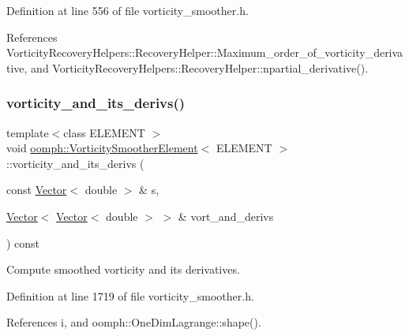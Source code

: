 Definition at line 556 of file vorticity\+\_\+smoother.\+h.



References Vorticity\+Recovery\+Helpers\+::\+Recovery\+Helper\+::\+Maximum\+\_\+order\+\_\+of\+\_\+vorticity\+\_\+derivative, and Vorticity\+Recovery\+Helpers\+::\+Recovery\+Helper\+::npartial\+\_\+derivative().

\mbox{\label{classoomph_1_1VorticitySmootherElement_a4bd88c454b07db0ef8b44e7912651425}} 
\subsubsection{\texorpdfstring{vorticity\+\_\+and\+\_\+its\+\_\+derivs()}{vorticity\_and\_its\_derivs()}}
{\footnotesize\ttfamily template$<$class E\+L\+E\+M\+E\+NT $>$ \\
void \hyperlink{classoomph_1_1VorticitySmootherElement}{oomph\+::\+Vorticity\+Smoother\+Element}$<$ E\+L\+E\+M\+E\+NT $>$\+::vorticity\+\_\+and\+\_\+its\+\_\+derivs (\begin{DoxyParamCaption}\item[{const \hyperlink{classoomph_1_1Vector}{Vector}$<$ double $>$ \&}]{s,  }\item[{\hyperlink{classoomph_1_1Vector}{Vector}$<$ \hyperlink{classoomph_1_1Vector}{Vector}$<$ double $>$ $>$ \&}]{vort\+\_\+and\+\_\+derivs }\end{DoxyParamCaption}) const\hspace{0.3cm}{\ttfamily [inline]}}



Compute smoothed vorticity and its derivatives. 



Definition at line 1719 of file vorticity\+\_\+smoother.\+h.



References i, and oomph\+::\+One\+Dim\+Lagrange\+::shape().

\mbox{\label{classoomph_1_1VorticitySmootherElement_a9bc82b8c6788d3a4c35166a35a479cc0}} 
